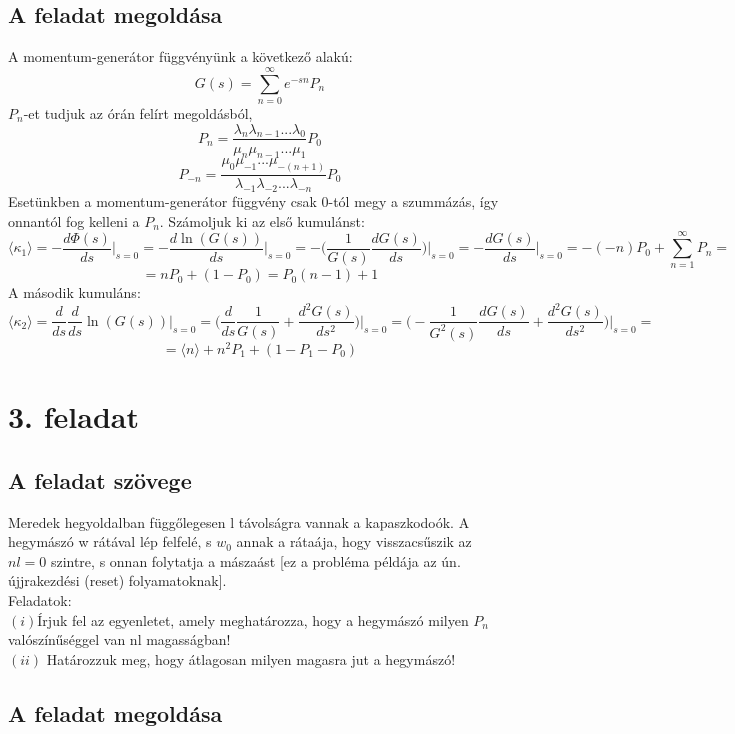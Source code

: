 \documentclass[12pt]{article}
\begin{document}
\subsection*{A feladat megoldása}
A momentum-generátor függvényünk a következő alakú:
$$G(s) = \sum^{\infty}_{n = 0}e^{-sn}P_n$$
$P_n$-et tudjuk az órán felírt megoldásból,
$$P_n = \frac{\lambda_n\lambda_{n-1}\text{...}\lambda_0}{\mu_n\mu_{n-1}\text{...}
\mu_1}P_0$$
$$P_{-n} =\frac{\mu_0\mu_{-1}{...}\mu_{-(n+1)}}{\lambda_{-1}\lambda_{-2}{...}\lambda_{-n}}P_0$$
Esetünkben a momentum-generátor függvény csak 0-tól megy a szummázás, így onnantól fog kelleni a $P_n$. Számoljuk ki az első kumulánst:
$$\langle \kappa_1 \rangle = -\frac{d\Phi(s)}{ds}\Big |_{s = 0} =- \frac{d \ln(G(s))}{ds}\Big |_{s = 0} =-\Big (\frac{1}{G(s)}\frac{dG(s)}{ds}\Big )\Big |_{s = 0} = -\frac{dG(s)}{ds} \Big |_{s = 0} =  -(-n)P_0 +\sum^\infty_{n=1}P_n=$$
$$=nP_0 + (1-P_0)=P_0(n-1)+ 1 $$ 
A második kumuláns:
$$\langle \kappa_2 \rangle = \frac{d}{ds}\frac{d}{ds}\ln(G(s))\Big |_{s = 0}= \Big (\frac{d}{ds}\frac{1}{G(s)}+\frac{d^2G(s)}{ds^2}\Big )\Big |_{s = 0} = \Big(- \frac{1}{G^2(s)}\frac{dG(s)}{ds}+  \frac{d^2G(s)}{ds^2}  \Big )\Big |_{s = 0} = $$
$$= \langle n \rangle + n^2 P_1+(1-P_1-P_0)$$
















\newpage
\section*{3. feladat}
\subsection*{A feladat szövege}
Meredek hegyoldalban függőlegesen l távolságra vannak a kapaszkodoók. A hegymászó w rátával lép felfelé, s $w_0$ annak a rátaája, hogy visszacsűszik az $nl = 0$ szintre, s onnan folytatja a mászaást [ez a probléma példája az ún. újjrakezdési (reset) folyamatoknak].
\\Feladatok:\\
$(i)$Írjuk fel az egyenletet, amely meghatározza, hogy a hegymászó milyen $P_n$ valószínűséggel van nl magasságban!\\
$(ii)$ Határozzuk meg, hogy átlagosan milyen magasra jut a hegymászó!
\subsection*{A feladat megoldása}
\end{document}
